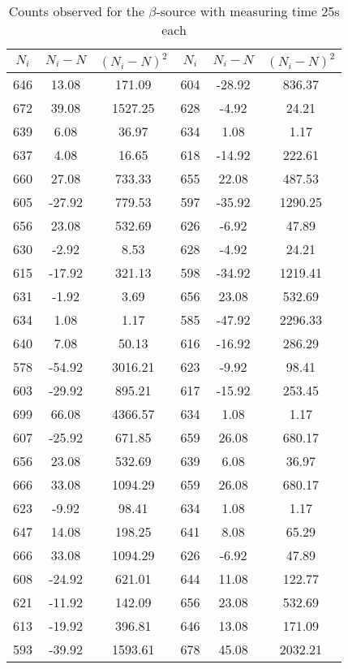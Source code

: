 \begin{table}[H]
    \centering
    \begin{tabular}{|ccc|ccc|}\hline
        $N_i$ & $N_i-N$ & $(N_i-N)^2$ & $N_i$ & $N_i-N$ & $(N_i-N)^2$ \\ \hline
        646 & 13.08 & 171.09 & 604 & -28.92 & 836.37 \\
672 & 39.08 & 1527.25 & 628 & -4.92 & 24.21 \\
639 & 6.08 & 36.97 & 634 & 1.08 & 1.17 \\
637 & 4.08 & 16.65 & 618 & -14.92 & 222.61 \\
660 & 27.08 & 733.33 & 655 & 22.08 & 487.53 \\
605 & -27.92 & 779.53 & 597 & -35.92 & 1290.25 \\
656 & 23.08 & 532.69 & 626 & -6.92 & 47.89 \\
630 & -2.92 & 8.53 & 628 & -4.92 & 24.21 \\
615 & -17.92 & 321.13 & 598 & -34.92 & 1219.41 \\
631 & -1.92 & 3.69 & 656 & 23.08 & 532.69 \\
634 & 1.08 & 1.17 & 585 & -47.92 & 2296.33 \\
640 & 7.08 & 50.13 & 616 & -16.92 & 286.29 \\
578 & -54.92 & 3016.21 & 623 & -9.92 & 98.41 \\
603 & -29.92 & 895.21 & 617 & -15.92 & 253.45 \\
699 & 66.08 & 4366.57 & 634 & 1.08 & 1.17 \\
607 & -25.92 & 671.85 & 659 & 26.08 & 680.17 \\
656 & 23.08 & 532.69 & 639 & 6.08 & 36.97 \\
666 & 33.08 & 1094.29 & 659 & 26.08 & 680.17 \\
623 & -9.92 & 98.41 & 634 & 1.08 & 1.17 \\
647 & 14.08 & 198.25 & 641 & 8.08 & 65.29 \\
666 & 33.08 & 1094.29 & 626 & -6.92 & 47.89 \\
608 & -24.92 & 621.01 & 644 & 11.08 & 122.77 \\
621 & -11.92 & 142.09 & 656 & 23.08 & 532.69 \\
613 & -19.92 & 396.81 & 646 & 13.08 & 171.09 \\
593 & -39.92 & 1593.61 & 678 & 45.08 & 2032.21\\\hline
    \end{tabular}
    \caption{Counts observed for the $\beta$-source with measuring time 25s each}
    \label{t7}
\end{table}